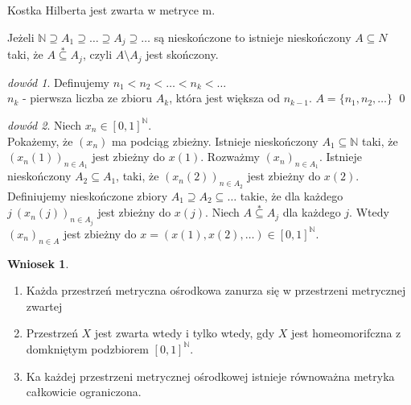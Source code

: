 \documentclass[twoside,10pt]{article}
\theoremstyle{definition}
\theoremstyle{definition}
\theoremstyle{definition}
\theoremstyle{definition}
\theoremstyle{remark}
\newtheorem*{dd}{dowód}
\theoremstyle{definition}
\theoremstyle{definition}
\newtheorem*{wn}{Wniosek}
\theoremstyle{definition}
\theoremstyle{definition}
\theoremstyle{definition}
\theoremstyle{definition}
\begin{document}
\begin{tw} Kostka Hilberta jest zwarta w metryce m. \end{tw} 
\begin{lem} 
    Jeżeli $\mathbb{N} \supseteq A_1 \supseteq \ldots \supseteq A_j \supseteq \ldots $ są nieskończone to 
    istnieje nieskończony $A \subseteq N$ taki, że $A \overset{\ast}{\subseteq} A_j$, czyli
    $A \setminus A_j$ jest skończony.
    \begin{dd} 
        Definujemy $n_1 < n_2 < \ldots < n_k < \ldots$ \\ 
        $n_k$ - pierwsza liczba ze zbioru $A_k$, która jest większa od $n_{k-1}$.
        $A = \{n_1,n_2,\ldots\}$ \hfill \qed
    \end{dd} 
\end{lem} 
\begin{dd} 
    Niech $x_n \in [0,1]^\mathbb{N}$. \\ 
    Pokażemy, że $(x_n)$ ma podciąg zbieżny. Istnieje nieskończony $A_1 \subseteq \mathbb{N}$ taki,  
    że $(x_n(1))_{n \in A_1}$ jest zbieżny do $x(1)$. Rozważmy $(x_n)_{n \in A_1}$. Istnieje 
    nieskończony $A_2 \subseteq A_1$, taki, że $(x_n (2))_{n \in A_2}$ jest zbieżny do $x(2)$. \\ 
    Definiujemy nieskończone zbiory $A_1 \supseteq A_2 \subseteq \ldots$ takie, że dla każdego 
    $j \ (x_n(j))_{n \in A_j}$ jest zbieżny do $x(j)$.
    Niech $A \overset{\ast}{\subseteq} A_j$ dla każdego $j$. Wtedy $(x_n)_{n \in A}$ jest zbieżny do 
    $x = (x(1),x(2),\ldots) \in [0,1]^\mathbb{N}$.
\end{dd} 

\begin{wn} \hfill 
    \begin{enumerate}[(1)]
        \item Każda przestrzeń metryczna ośrodkowa zanurza się w przestrzeni metrycznej zwartej
        \item Przestrzeń $X$ jest zwarta wtedy i tylko wtedy, gdy $X$ jest homeomorifczna z domkniętym
            podzbiorem $[0,1]^\mathbb{N}$.
        \item Ka każdej przestrzeni metrycznej ośrodkowej istnieje równoważna metryka całkowicie ograniczona.
    \end{enumerate}
\end{wn} 
\end{document}
